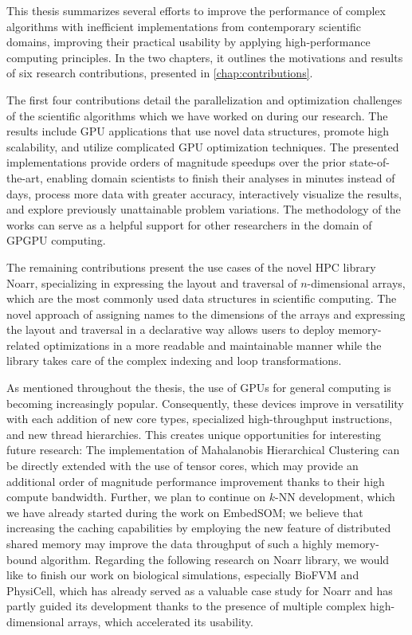 
This thesis summarizes several efforts to improve the performance of complex algorithms with inefficient implementations from contemporary scientific domains, improving their practical usability by applying high-performance computing principles. In the two chapters, it outlines the motivations and results of six research contributions, presented in \cref{chap:contributions}.

The first four contributions detail the parallelization and optimization challenges of the scientific algorithms which we have worked on during our research. The results include GPU applications that use novel data structures, promote high scalability, and utilize complicated GPU optimization techniques. The presented implementations provide orders of magnitude speedups over the prior state-of-the-art, enabling domain scientists to finish their analyses in minutes instead of days, process more data with greater accuracy, interactively visualize the results, and explore previously unattainable problem variations. The methodology of the works can serve as a helpful support for other researchers in the domain of GPGPU computing.

The remaining contributions present the use cases of the novel HPC library Noarr, specializing in expressing the layout and traversal of $n$-dimensional arrays, which are the most commonly used data structures in scientific computing. The novel approach of assigning names to the dimensions of the arrays and expressing the layout and traversal in a declarative way allows users to deploy memory-related optimizations in a more readable and maintainable manner while the library takes care of the complex indexing and loop transformations.

As mentioned throughout the thesis, the use of GPUs for general computing is becoming increasingly popular. Consequently, these devices improve in versatility with each addition of new core types, specialized high-throughput instructions, and new thread hierarchies. This creates unique opportunities for interesting future research: The implementation of Mahalanobis Hierarchical Clustering can be directly extended with the use of tensor cores, which may provide an additional order of magnitude performance improvement thanks to their high compute bandwidth. Further, we plan to continue on $k$-NN development, which we have already started during the work on EmbedSOM; we believe that increasing the caching capabilities by employing the new feature of distributed shared memory may improve the data throughput of such a highly memory-bound algorithm. Regarding the following research on Noarr library, we would like to finish our work on biological simulations, especially BioFVM and PhysiCell, which has already served as a valuable case study for Noarr and has partly guided its development thanks to the presence of multiple complex high-dimensional arrays, which accelerated its usability.

